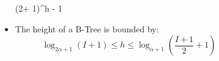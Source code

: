 \begin{frame}
\begin{columns}
\begin{column}{\textlecolumn}
\begin{block}{}
\begin{itemize}
                            \left(2\alpha + 1\right){}^h - 1
                        \)
                    \item The height of a B-Tree is bounded by:
                        \[
                            \log_{2\alpha + 1}\left(I + 1\right)
                            \leq
                            h
                            \leq
                            \log_{\alpha + 1}\left(\frac{I + 1}{2} + 1\right)
                        \]
                \end{itemize}
            \end{block}
        \end{column}
        \begin{column}{\textricolumn}
        \end{column}
    \end{columns}
\end{frame}

